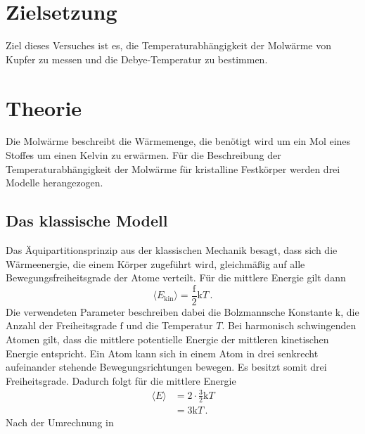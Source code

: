 \section{Zielsetzung}
Ziel dieses Versuches ist es, die Temperaturabhängigkeit der Molwärme von Kupfer
zu messen und die Debye-Temperatur zu bestimmen.
\section{Theorie}
Die Molwärme beschreibt die Wärmemenge, die benötigt wird um ein Mol eines
Stoffes um einen Kelvin zu erwärmen. Für die Beschreibung der
Temperaturabhängigkeit der Molwärme für kristalline Festkörper
werden drei Modelle herangezogen.

\subsection{Das klassische Modell}
Das Äquipartitionsprinzip aus der klassischen Mechanik besagt, dass sich die
Wärmeenergie, die einem Körper zugeführt wird, gleichmäßig auf alle
Bewegungsfreiheitsgrade der Atome verteilt. Für die mittlere Energie gilt dann
\begin{equation}
  \langle E_{\text{kin}} \rangle = \frac{\text{f}}{2} \text{k} T \, .
\end{equation}
Die verwendeten Parameter beschreiben dabei die Bolzmannsche Konstante
$\text{k}$, die Anzahl der Freiheitsgrade $\text{f}$ und die Temperatur $T$. Bei
harmonisch schwingenden Atomen gilt, dass die mittlere potentielle Energie
der mittleren kinetischen Energie entspricht. Ein Atom kann sich in einem
Atom in drei senkrecht aufeinander stehende Bewegungsrichtungen bewegen. Es
besitzt somit drei Freiheitsgrade. Dadurch folgt für die mittlere Energie
\begin{align*}
  \langle E \rangle &= 2 \cdot \frac{3}{2} \text{k} T \\
                    &= 3 \text{k} T  \, .
\end{align*}
Nach der Umrechnung in 
